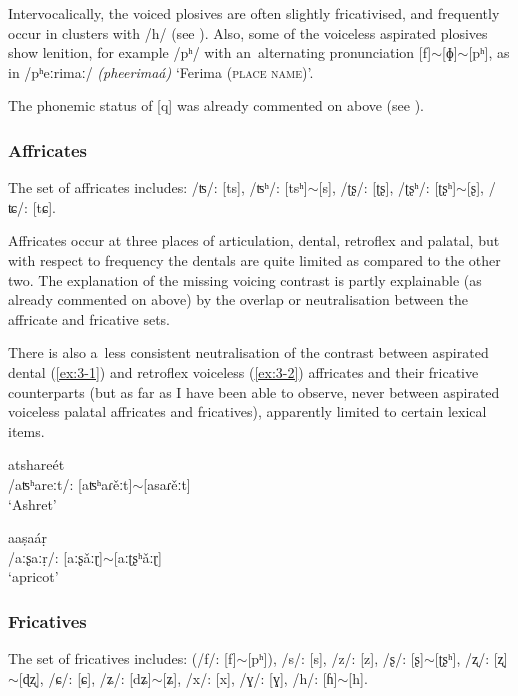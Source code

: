 Intervocalically, the voiced plosives are often slightly fricativised, and frequently occur in clusters with /h/ (see ). Also, some of the voiceless aspirated plosives show lenition, for example /pʰ/ with an~alternating pronunciation [f]$\sim$[ɸ]$\sim$[pʰ], as in /pʰeːrimaː/ \textit{(pheerimaá)} `Ferima (\textsc{place name)}'. 


The phonemic status of [q] was already commented on above (see ).


\subsubsection*{Affricates}

The set of affricates includes: /ʦ/: [ts], /ʦʰ/: [tsʰ]$\sim$[s], /ʈʂ/: [ʈʂ], /ʈʂʰ/: [ʈʂʰ]$\sim$[ʂ], /ʨ/: [tɕ].


Affricates occur at three places of articulation, dental, retroflex and palatal, but with respect to frequency the dentals are quite limited as compared to the other two. The explanation of the missing voicing contrast is partly explainable (as already commented on above) by the overlap or neutralisation between the affricate and fricative sets. 


There is also a~less consistent neutralisation of the contrast between aspirated dental (\ref{ex:3-1}) and retroflex voiceless (\ref{ex:3-2}) affricates and their fricative counterparts (but as far as I have been able to observe, never between aspirated voiceless palatal affricates and fricatives), apparently limited to certain lexical items. 

\begin{exe}
\ex
\label{ex:3-1}
\gll atshareét \\
 /aʦʰareːt/: [aʦʰaɾěːt]$\sim$[asaɾěːt] \\
\glt `Ashret'

\ex
\label{ex:3-2}
\gll aaṣaáṛ \\
/aːʂaːṛ/: [aːʂǎːɽ]$\sim$[aːʈʂʰǎːɽ] \\
\glt `apricot'
\end{exe}

\subsubsection*{Fricatives}

The set of fricatives includes: (/f/: [f]$\sim$[pʰ]), /s/: [s], /z/: [z], /ʂ/: [ʂ]$\sim$[ʈʂʰ], /ʐ/: [ʐ]$\sim$[ɖʐ], /ɕ/: [ɕ], /ʑ/: [dʑ]$\sim$[ʑ], /x/: [x], /ɣ/: [ɣ], /h/: [ɦ]$\sim$[h].


